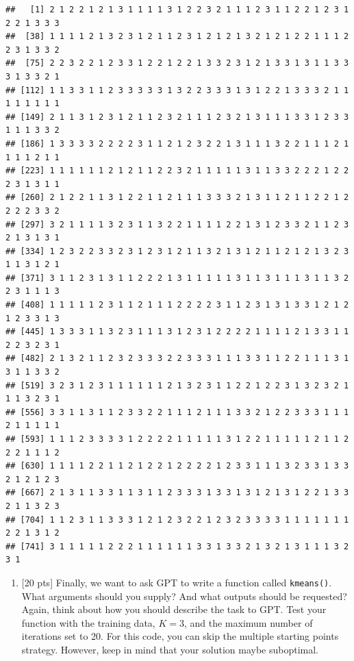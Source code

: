 \documentclass[
]{article}
\providecommand{\tightlist}{%
  \setlength{\itemsep}{0pt}\setlength{\parskip}{0pt}}
\begin{document}
\begin{verbatim}
##   [1] 2 1 2 2 1 2 1 3 1 1 1 1 3 1 2 2 3 2 1 1 1 2 3 1 1 2 2 1 2 3 1 2 2 1 3 3 3
##  [38] 1 1 1 1 2 1 3 2 3 1 2 1 1 2 3 1 2 1 2 1 3 2 1 2 1 2 2 1 1 1 2 2 3 1 3 3 2
##  [75] 2 2 3 2 2 1 2 3 3 1 2 2 1 2 2 1 3 3 2 3 1 2 1 3 3 1 3 1 1 3 3 3 1 3 3 2 1
## [112] 1 1 3 3 1 1 2 3 3 3 3 3 1 3 2 2 3 3 3 1 3 1 2 2 1 3 3 3 2 1 1 1 1 1 1 1 1
## [149] 2 1 1 3 1 2 3 1 2 1 1 2 3 2 1 1 1 2 3 2 1 3 1 1 1 3 3 1 2 3 3 1 1 1 3 3 2
## [186] 1 3 3 3 3 2 2 2 2 3 1 1 2 1 2 3 2 2 1 3 1 1 1 3 2 2 1 1 1 2 1 1 1 1 2 1 1
## [223] 1 1 1 1 1 1 2 1 2 1 1 2 2 3 2 1 1 1 1 1 3 1 1 3 3 2 2 2 1 2 2 2 3 1 3 1 1
## [260] 2 1 2 2 1 1 3 1 2 2 1 1 2 1 1 1 3 3 3 2 1 3 1 1 2 1 1 2 2 1 2 2 2 2 3 3 2
## [297] 3 2 1 1 1 1 3 2 3 1 1 3 2 2 1 1 1 1 2 2 1 3 1 2 3 3 2 1 1 2 3 2 1 3 1 3 1
## [334] 1 2 3 2 2 3 3 2 3 1 2 3 1 2 1 1 3 2 1 3 1 2 1 1 2 1 2 1 3 2 3 1 1 3 1 2 1
## [371] 3 1 1 2 3 1 3 1 1 2 2 2 1 3 1 1 1 1 1 3 1 1 3 1 1 1 3 1 1 3 2 2 3 1 1 1 3
## [408] 1 1 1 1 1 2 3 1 1 2 1 1 1 2 2 2 2 3 1 1 2 3 1 3 1 3 3 1 2 1 2 1 2 3 3 1 3
## [445] 1 3 3 3 1 1 3 2 3 1 1 1 3 1 2 3 1 2 2 2 2 1 1 1 1 2 1 3 3 1 1 2 2 3 2 3 1
## [482] 2 1 3 2 1 1 2 3 2 3 3 3 2 2 3 3 3 1 1 1 3 3 1 1 2 2 1 1 1 3 1 3 1 1 3 3 2
## [519] 3 2 3 1 2 3 1 1 1 1 1 1 2 1 3 2 3 1 1 2 2 1 2 2 3 1 3 2 3 2 1 1 1 3 2 3 1
## [556] 3 3 1 1 3 1 1 2 3 3 2 2 1 1 1 2 1 1 1 3 3 2 1 2 2 3 3 3 1 1 1 2 1 1 1 1 1
## [593] 1 1 1 2 3 3 3 3 1 2 2 2 2 1 1 1 1 1 3 1 2 2 1 1 1 1 1 2 1 1 2 2 2 1 1 1 2
## [630] 1 1 1 1 2 2 1 1 2 1 2 2 1 2 2 2 2 1 2 3 3 1 1 1 3 2 3 3 1 3 3 2 1 2 1 2 3
## [667] 2 1 3 1 1 3 3 1 1 3 1 1 2 3 3 3 1 3 3 1 3 1 2 1 3 1 2 2 1 3 3 2 1 1 3 2 3
## [704] 1 1 2 3 1 1 3 3 3 1 2 1 2 3 2 2 1 2 3 2 3 3 3 3 1 1 1 1 1 1 1 2 2 1 3 1 2
## [741] 3 1 1 1 1 1 2 2 2 1 1 1 1 1 1 3 3 1 3 3 2 1 3 2 1 3 1 1 1 3 2 3 1
\end{verbatim}

\bigskip

\begin{enumerate}
\def\labelenumi{\alph{enumi}.}
\setcounter{enumi}{2}
\tightlist
\item
  {[}20 pts{]} Finally, we want to ask GPT to write a function called
  \texttt{kmeans()}. What arguments should you supply? And what outputs
  should be requested? Again, think about how you should describe the
  task to GPT. Test your function with the training data, \(K = 3\), and
  the maximum number of iterations set to 20. For this code, you can
  skip the multiple starting points strategy. However, keep in mind that
  your solution maybe suboptimal.
\end{enumerate}
\end{document}
